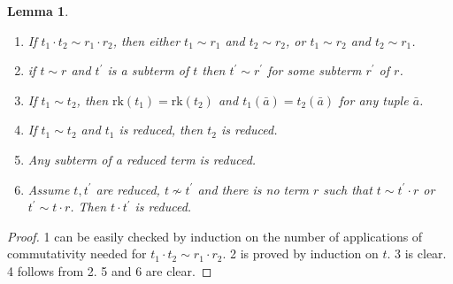 \documentclass[10pt,a4paper]{article}
\newcommand{\rk}{\mathrm{rk}}
\theoremstyle{note}
\newtheorem{lemma}[thm]{Lemma}
\begin{document}
	\begin{lemma}\label{May12_3}\begin{enumerate}
			\item If $t_1\cdot t_2\sim r_1\cdot r_2$, then either  $t_1\sim r_1$ and $t_2\sim r_2$,  or  $t_1\sim r_2$ and $t_2\sim r_1$.
			\item if $t\sim r$ and $t^\prime$ is a subterm of $t$ then $t^\prime\sim r^\prime$ for some subterm $r^\prime$ of $r$.
			\item If $t_1\sim t_2$, then $\rk(t_1)= \rk(t_2)$  and  $t_1(\bar{a})= t_2(\bar{a})$  for any tuple $\bar{a}$.
			\item If  $t_1\sim t_2$ and $t_1$ is reduced, then $t_2$ is reduced.
			\item Any subterm of a reduced term is reduced.
			\item Assume $t,t^\prime$ are reduced, $t\not\sim t^\prime$ and there is no term $r$ such that  $t\sim t^\prime\cdot r$ or $t^\prime\sim t\cdot r$. Then $t\cdot t^\prime$ is reduced.
		\end{enumerate}
	\end{lemma}
	\begin{proof} 1 can be easily checked by induction on the number of applications of commutativity needed for $t_1\cdot t_2\sim r_1\cdot r_2$.  2 is proved by induction on $t$.  3 is clear.  4 follows from 2. 5  and 6 are clear.
	\end{proof}
\end{document}
